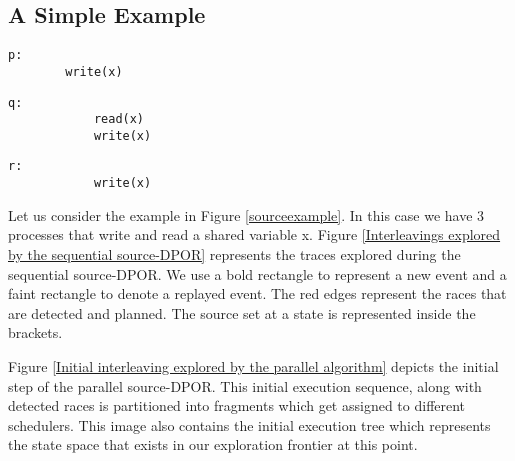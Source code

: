 \subsection{A Simple Example}


\begin{figure*}
    \begin{minipage}{0.3\textwidth}
      \begin{lstlisting}[frame=none, numbers=none]
        p:
        write(x)
      \end{lstlisting}
    \end{minipage}
    \begin{minipage}{0.3\textwidth}
        \begin{lstlisting}[frame=none, numbers=none]
            q:
            read(x)
            write(x)
        \end{lstlisting}
      \end{minipage}
      \begin{minipage}{0.3\textwidth}
        \begin{lstlisting}[frame=none, numbers=none]
            r:
            write(x)
        \end{lstlisting}
      \end{minipage}
      \caption{Simple readers-writes example}
      \label{sourceexample}
  \end{figure*}

Let us consider the example in Figure \ref{sourceexample}. In this case we have 3 processes that write and read a shared variable x.
Figure \ref{Interleavings explored by the sequential source-DPOR} represents the traces explored during the sequential source-DPOR.
We use a bold rectangle to represent a new event and a faint rectangle to denote a replayed event. The red edges represent
the races that are detected and planned. The source set at a state is represented inside the brackets.



Figure \ref{Initial interleaving explored by the parallel algorithm} depicts the initial step of the parallel source-DPOR. 
This initial execution sequence, along with detected races is partitioned into fragments which get assigned to different schedulers.
This image also contains the initial execution tree which represents the state space that exists in our exploration frontier
at this point.

